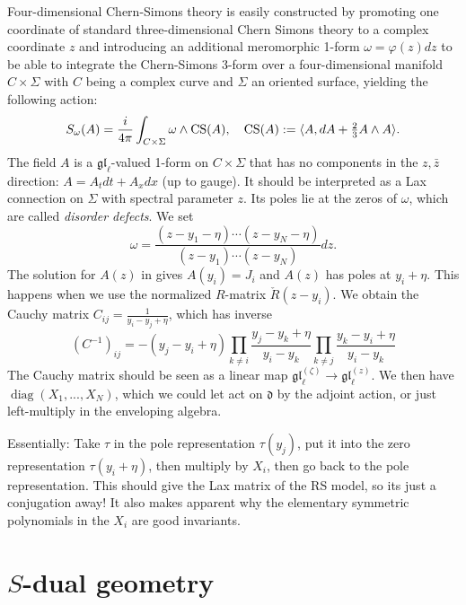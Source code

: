 \documentclass[11pt]{report}
\theoremstyle{definition}
\theoremstyle{remark}
\theoremstyle{remark}
\begin{document}
Four-dimensional Chern-Simons theory is easily constructed by promoting one coordinate of standard three-dimensional Chern Simons theory to a complex coordinate $z$ and introducing an additional meromorphic 1-form $\omega = \varphi(z) dz$ to be able to integrate the Chern-Simons 3-form over a four-dimensional manifold $C \times \Sigma$ with $C$ being a complex curve and $\Sigma$ an oriented surface, yielding the following action:
\begin{equation*}
S_\omega(A) = \frac{i}{4\pi} \int_{C \times \Sigma} \omega \wedge \textnormal{CS}(A), \quad \textnormal{CS}(A) := \langle A, dA + \tfrac 23 A \wedge A \rangle.
\end{equation*}
The field $A$ is a $\mathfrak{gl}_\ell$-valued 1-form on $C \times \Sigma$ that has no components in the $z,\bar z$ direction: $A = A_t dt + A_x dx$ (up to gauge). It should be interpreted as a Lax connection on $\Sigma$ with spectral parameter $z$. Its poles lie at the zeros of $\omega$, which are called \emph{disorder defects}. We set
\begin{equation*}
\omega = \frac{(z-y_1-\eta) \cdots (z-y_N-\eta)}{(z-y_1) \cdots (z-y_N)} dz.
\end{equation*}
The solution for $A(z)$ in \cite{article:lacroix:2021} gives $A(y_i) = J_i$ and $A(z)$ has poles at $y_i+\eta$. This happens when we use the normalized $R$-matrix $\check R(z-y_i)$. We obtain the Cauchy matrix $C_{ij} = \frac{1}{y_i-y_j+\eta}$, which has inverse
\begin{equation*}
(C^{-1})_{ij} = -(y_j-y_i+\eta) \prod_{k \neq i} \frac{y_j-y_k+\eta}{y_i-y_k} \prod_{k \neq j} \frac{y_k-y_i+\eta}{y_i-y_k}
\end{equation*}
The Cauchy matrix should be seen as a linear map $\mathfrak{gl}_\ell^{(\zeta)} \to \mathfrak{gl}_\ell^{(z)}$. We then have $\operatorname{diag}(X_1,...,X_N)$, which we could let act on $\mathfrak{d}$ by the adjoint action, or just left-multiply in the enveloping algebra.

Essentially: Take $\tau$ in the pole representation $\tau(y_j)$, put it into the zero representation $\tau(y_i+\eta)$, then multiply by $X_i$, then go back to the pole representation. This should give the Lax matrix of the RS model, so its just a conjugation away! It also makes apparent why the elementary symmetric polynomials in the $X_i$ are good invariants.

\section{$S$-dual geometry}
\end{document}
